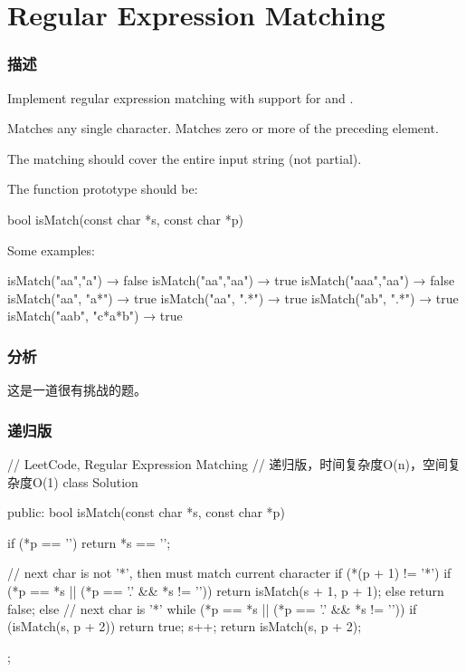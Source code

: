 \section{Regular Expression Matching} %
\label{sec:regular-expression-matching}


\subsubsection{描述}
Implement regular expression matching with support for  and .

 Matches any single character.
 Matches zero or more of the preceding element.

The matching should cover the entire input string (not partial).

The function prototype should be:
\begin{Code}
bool isMatch(const char *s, const char *p)
\end{Code}

Some examples:
\begin{Code}
isMatch("aa","a") → false
isMatch("aa","aa") → true
isMatch("aaa","aa") → false
isMatch("aa", "a*") → true
isMatch("aa", ".*") → true
isMatch("ab", ".*") → true
isMatch("aab", "c*a*b") → true
\end{Code}


\subsubsection{分析}
这是一道很有挑战的题。


\subsubsection{递归版}
\begin{Code}
// LeetCode, Regular Expression Matching
// 递归版，时间复杂度O(n)，空间复杂度O(1)
class Solution {
public:
    bool isMatch(const char *s, const char *p) {
        if (*p == '\0') return *s == '\0';

        // next char is not '*', then must match current character
        if (*(p + 1) != '*') {
            if (*p == *s || (*p == '.' && *s != '\0'))
                return isMatch(s + 1, p + 1);
            else
                return false;
        } else { // next char is '*'
            while (*p == *s || (*p == '.' && *s != '\0')) {
                if (isMatch(s, p + 2))
                    return true;
                s++;
            }
            return isMatch(s, p + 2);
        }
    }
};
\end{Code}


